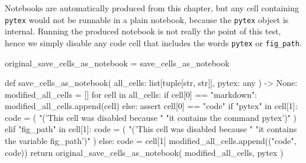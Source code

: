 \documentclass[oneside]{book}
\begin{document}
Notebooks are automatically produced from this chapter, but any cell containing \texttt{pytex} would not be runnable in a plain notebook, because the \texttt{pytex} object is internal. Running the produced notebook is not really the point of this test, hence we simply disable any code cell that includes the words \texttt{pytex} or \texttt{fig\_path}.

\begin{pycell}
original_save_cells_as_notebook = save_cells_as_notebook

def save_cells_as_notebook(
    all_cells: list[tuple[str, str]], pytex: any
) -> None:
    modified_all_cells = []
    for cell in all_cells:
        if cell[0] == "markdown":
            modified_all_cells.append(cell)
        else:
            assert cell[0] == "code"
            if "pytex" in cell[1]:
                code = (
                    "\nprint('This cell was disabled because "
                    "it contains the command pytex')"
                )
            elif "fig_path" in cell[1]:
                code = (
                    "\nprint('This cell was disabled because "
                    "it contains the variable fig_path')"
                )
            else:
                code = cell[1]
            modified_all_cells.append(("code", code))
    return original_save_cells_as_notebook(
        modified_all_cells, pytex
    )
\end{pycell}
\end{document}
